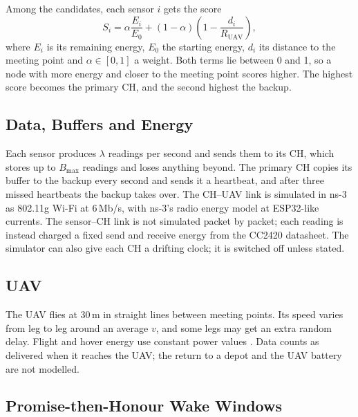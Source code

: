 \documentclass[conference]{IEEEtran}
\begin{document}
Among the candidates, each sensor $i$ gets the score
\begin{equation}
S_i = \alpha \frac{E_i}{E_0} + (1-\alpha)\left(1 - \frac{d_i}{R_\mathrm{UAV}}\right),
\label{eq:score}
\end{equation}
where $E_i$ is its remaining energy, $E_0$ the starting energy, $d_i$ its distance to the meeting
point and $\alpha \in [0,1]$ a weight. Both terms lie between 0 and 1, so a node with more energy
and closer to the meeting point scores higher. The highest score becomes the primary CH, and
the second highest the backup.

\subsection{Data, Buffers and Energy}

Each sensor produces $\lambda$ readings per second and sends them to its CH, which stores up to
$B_{\max}$ readings and loses anything beyond. The primary CH copies its buffer to the backup
every second and sends it a heartbeat, and after three missed heartbeats the backup takes over.
The CH--UAV link is simulated in ns-3 as 802.11g Wi-Fi at 6\,Mb/s, with ns-3's radio energy
model at ESP32-like currents. The sensor--CH link is not simulated packet by packet; each reading
is instead charged a fixed send and receive energy from the CC2420 datasheet. The simulator can
also give each CH a drifting clock; it is switched off unless stated.

\subsection{UAV}

The UAV flies at 30\,m in straight lines between meeting points. Its speed varies from leg to
leg around an average $v$, and some legs may get an extra random delay. Flight and hover energy
use constant power values \cite{zeng2019rotary}. Data counts as delivered when it reaches the
UAV; the return to a depot and the UAV battery are not modelled.

\subsection{Promise-then-Honour Wake Windows}\label{sec:wake}
\end{document}
